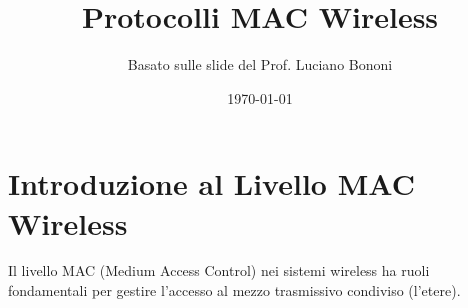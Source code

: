 

\title{Protocolli MAC Wireless}
\author{Basato sulle slide del Prof. Luciano Bononi}
\date{\today}



\maketitle
\tableofcontents
\newpage

\section{Introduzione al Livello MAC Wireless}
Il livello MAC (Medium Access Control) nei sistemi wireless ha ruoli fondamentali per gestire l'accesso al mezzo trasmissivo condiviso (l'etere).

